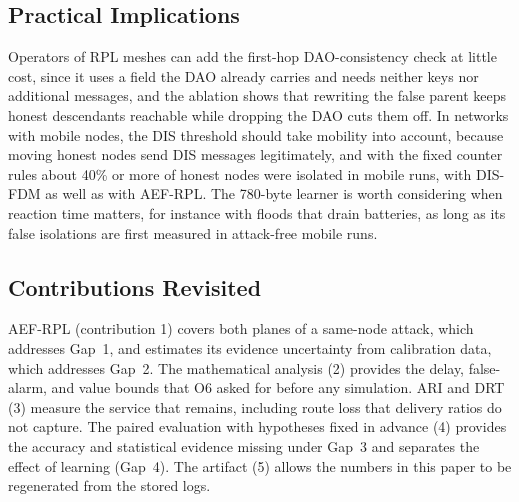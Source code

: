 \subsection{Practical Implications}
Operators of RPL meshes can add the first-hop DAO-consistency check at little cost, since it uses a field the DAO already carries and needs neither keys nor additional messages, and the ablation shows that rewriting the false parent keeps honest descendants reachable while dropping the DAO cuts them off. In networks with mobile nodes, the DIS threshold should take mobility into account, because moving honest nodes send DIS messages legitimately, and with the fixed counter rules about 40\% or more of honest nodes were isolated in mobile runs, with DIS-FDM as well as with AEF-RPL. The 780-byte learner is worth considering when reaction time matters, for instance with floods that drain batteries, as long as its false isolations are first measured in attack-free mobile runs.

\subsection{Contributions Revisited}
AEF-RPL (contribution 1) covers both planes of a same-node attack, which addresses Gap~1, and estimates its evidence uncertainty from calibration data, which addresses Gap~2. The mathematical analysis (2) provides the delay, false-alarm, and value bounds that O6 asked for before any simulation. ARI and DRT (3) measure the service that remains, including route loss that delivery ratios do not capture. The paired evaluation with hypotheses fixed in advance (4) provides the accuracy and statistical evidence missing under Gap~3 and separates the effect of learning (Gap~4). The artifact (5) allows the numbers in this paper to be regenerated from the stored logs.

